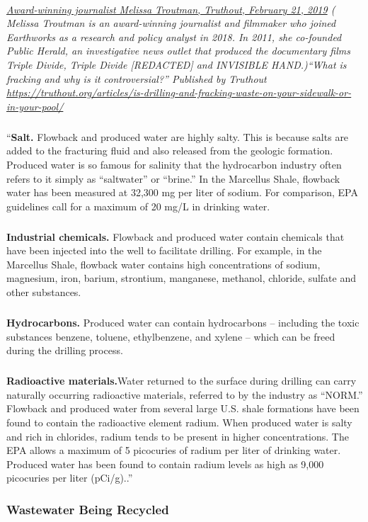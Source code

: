 \documentclass{article}
\begin{document}
\paragraph{}
\small
\textit{
\underline{Award-winning journalist Melissa Troutman, Truthout, February 21, 2019}
( Melissa Troutman is an award-winning journalist and filmmaker who joined Earthworks as a research and policy analyst in 2018. In 2011, she co-founded Public Herald, an investigative news outlet that produced the documentary films Triple Divide, Triple Divide [REDACTED] and INVISIBLE HAND.)``What is fracking and why is it controversial?'' Published by Truthout
\url{https://truthout.org/articles/is-drilling-and-fracking-waste-on-your-sidewalk-or-in-your-pool/}}
\normalsize
\subparagraph{}
``\textbf{Salt.} Flowback and produced water are highly salty. This is because salts are added to the fracturing fluid and also released from the geologic formation. Produced water is so famous for salinity that the hydrocarbon industry often refers to it simply as “saltwater” or “brine.” In the Marcellus Shale, flowback water has been measured at 32,300 mg per liter of sodium. For comparison, EPA guidelines call for a maximum of 20 mg/L in drinking water.
\subparagraph{}
\textbf{Industrial chemicals.} Flowback and produced water contain chemicals that have been injected into the well to facilitate drilling. For example, in the Marcellus Shale, flowback water contains high concentrations of sodium, magnesium, iron, barium, strontium, manganese, methanol, chloride, sulfate and other substances.
\subparagraph{}
\textbf{Hydrocarbons.} Produced water can contain hydrocarbons -- including the toxic substances benzene, toluene, ethylbenzene, and xylene – which can be freed during the drilling process.
\subparagraph{}
\textbf{Radioactive materials.}Water returned to the surface during drilling can carry naturally occurring radioactive materials, referred to by the industry as “NORM.” Flowback and produced water from several large U.S. shale formations have been found to contain the radioactive element radium. When produced water is salty and rich in chlorides, radium tends to be present in higher concentrations.
The EPA allows a maximum of 5 picocuries of radium per liter of drinking water. Produced water has been found to contain radium levels as high as 9,000 picocuries per liter (pCi/g)..”

\subsubsection{Wastewater Being Recycled}
\end{document}
